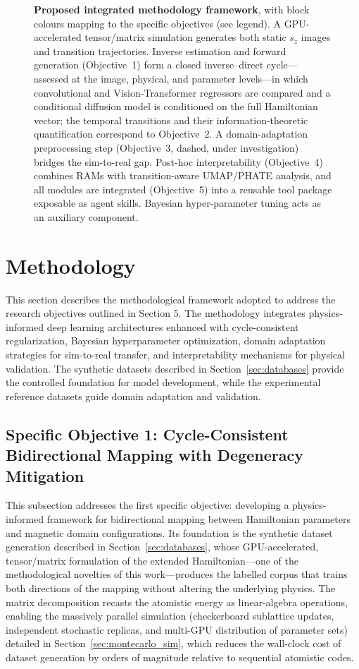 \documentclass[letterpaper, 12, one column]{article}
\begin{document}
\begin{figure}[H]
{\begin{tikzpicture}
\end{tikzpicture}}
\caption{\textbf{Proposed integrated methodology framework}, with block colours mapping to the specific objectives (see legend). A GPU-accelerated tensor/matrix simulation generates both static $s_z$ images and transition trajectories. Inverse estimation and forward generation (Objective~1) form a closed inverse--direct cycle---assessed at the image, physical, and parameter levels---in which convolutional and Vision-Transformer regressors are compared and a conditional diffusion model is conditioned on the full Hamiltonian vector; the temporal transitions and their information-theoretic quantification correspond to Objective~2. A domain-adaptation preprocessing step (Objective~3, dashed, under investigation) bridges the sim-to-real gap. Post-hoc interpretability (Objective~4) combines RAMs with transition-aware UMAP/PHATE analysis, and all modules are integrated (Objective~5) into a reusable tool package exposable as agent skills. Bayesian hyper-parameter tuning acts as an auxiliary component.}
\label{fig:proposed_pipeline}
\end{figure}

\section{Methodology}\label{sec:Material_methods}

This section describes the methodological framework adopted to address the research objectives outlined in Section 5. The methodology integrates physics-informed deep learning architectures enhanced with cycle-consistent regularization, Bayesian hyperparameter optimization, domain adaptation strategies for sim-to-real transfer, and interpretability mechanisms for physical validation. The synthetic datasets described in Section~\ref{sec:databases} provide the controlled foundation for model development, while the experimental reference datasets guide domain adaptation and validation.

\subsection{Specific Objective 1: Cycle-Consistent Bidirectional Mapping with Degeneracy Mitigation}

This subsection addresses the first specific objective: developing a physics-informed framework for bidirectional mapping between Hamiltonian parameters and magnetic domain configurations. Its foundation is the synthetic dataset generation described in Section~\ref{sec:databases}, whose GPU-accelerated, tensor/matrix formulation of the extended Hamiltonian---one of the methodological novelties of this work---produces the labelled corpus that trains both directions of the mapping without altering the underlying physics. The matrix decomposition recasts the atomistic energy as linear-algebra operations, enabling the massively parallel simulation (checkerboard sublattice updates, independent stochastic replicas, and multi-GPU distribution of parameter sets) detailed in Section~\ref{sec:montecarlo_sim}, which reduces the wall-clock cost of dataset generation by orders of magnitude relative to sequential atomistic codes.
\end{document}
